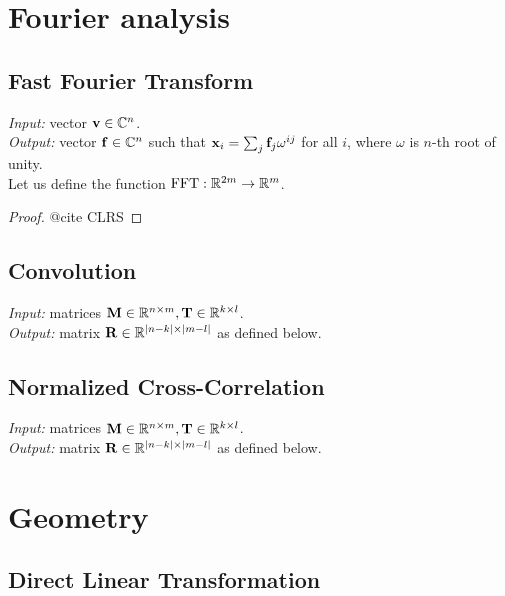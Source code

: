 \section{Fourier analysis}

\subsection{Fast Fourier Transform}
\textit{Input:} vector $\mathbf{v} \in \mathbb{C}^n$.\\
\textit{Output:} vector $\mathbf{f} \in \mathbb{C}^n$ such that $\mathbf{x}_i = \sum_j \mathbf{f}_j \omega^{i j}$ for all $i$, where $\omega$ is $n$-th root of unity.\\

Let us define the function $\mathrm{FFT}: \mathbb{R}^{2m} \to \mathbb{R}^m$.

\begin{proof}
@cite CLRS
\end{proof}

\subsection{Convolution}

\textit{Input:} matrices $\mathbf{M} \in \mathbb{R}^{n \times m}, \mathbf{T} \in \mathbb{R}^{k \times l}$.\\
\textit{Output:} matrix $\mathbf{R} \in \mathbb{R}^{|n-k| \times |m - l|}$ as defined below.\\

\subsection{Normalized Cross-Correlation}

\textit{Input:} matrices $\mathbf{M} \in \mathbb{R}^{n \times m}, \mathbf{T} \in \mathbb{R}^{k \times l}$.\\
\textit{Output:} matrix $\mathbf{R} \in \mathbb{R}^{|n-k| \times |m - l|}$ as defined below.\\


\section{Geometry}

\subsection{Direct Linear Transformation}

